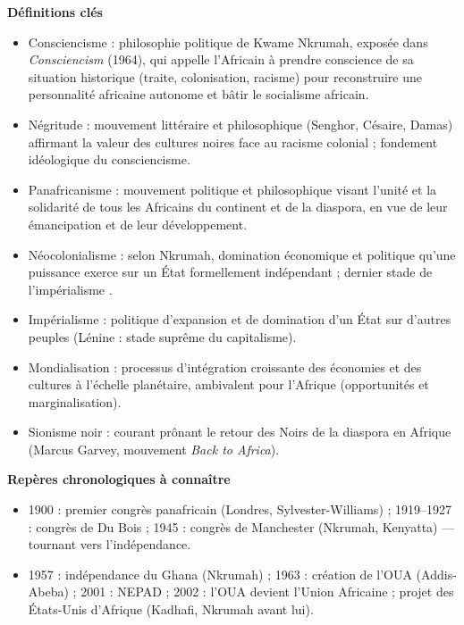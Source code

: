 \documentclass[11pt]{article}
\newcommand{\cle}[1]{{\popxbold\color{popdark}#1}}
\begin{document}
\begin{bilan}
\textbf{Définitions clés}
\begin{itemize}
  \item \cle{Consciencisme} : philosophie politique de Kwame Nkrumah, exposée dans \emph{Consciencism} (1964), qui appelle l'Africain à prendre conscience de sa situation historique (traite, colonisation, racisme) pour reconstruire une personnalité africaine autonome et bâtir le socialisme africain.
  \item \cle{Négritude} : mouvement littéraire et philosophique (Senghor, Césaire, Damas) affirmant la valeur des cultures noires face au racisme colonial ; fondement idéologique du consciencisme.
  \item \cle{Panafricanisme} : mouvement politique et philosophique visant l'unité et la solidarité de tous les Africains du continent et de la diaspora, en vue de leur émancipation et de leur développement.
  \item \cle{Néocolonialisme} : selon Nkrumah, domination économique et politique qu'une puissance exerce sur un État formellement indépendant ; \guillemotleft dernier stade de l'impérialisme \guillemotright.
  \item \cle{Impérialisme} : politique d'expansion et de domination d'un État sur d'autres peuples (Lénine : stade suprême du capitalisme).
  \item \cle{Mondialisation} : processus d'intégration croissante des économies et des cultures à l'échelle planétaire, ambivalent pour l'Afrique (opportunités et marginalisation).
  \item \cle{Sionisme noir} : courant prônant le retour des Noirs de la diaspora en Afrique (Marcus Garvey, mouvement \emph{Back to Africa}).
\end{itemize}

\textbf{Repères chronologiques à connaître}
\begin{itemize}
  \item 1900 : premier congrès panafricain (Londres, Sylvester-Williams) ; 1919--1927 : congrès de Du Bois ; 1945 : congrès de Manchester (Nkrumah, Kenyatta) — tournant vers l'indépendance.
  \item 1957 : indépendance du Ghana (Nkrumah) ; 1963 : création de l'OUA (Addis-Abeba) ; 2001 : NEPAD ; 2002 : l'OUA devient l'Union Africaine ; projet des \cle{États-Unis d'Afrique} (Kadhafi, Nkrumah avant lui).
\end{itemize}


\end{bilan}
\end{document}
